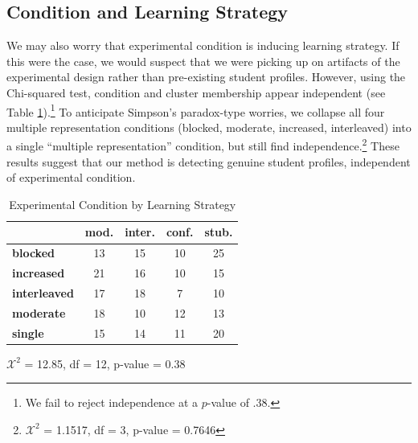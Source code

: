 \documentclass{edm_template}
\begin{document}
\subsection{Condition and Learning Strategy}

We may also worry that experimental condition is inducing learning strategy. If this were the case, we would suspect that we were picking up on artifacts of the experimental design rather than pre-existing student profiles. However, using the Chi-squared test, condition and cluster membership appear independent (see Table \ref{tab:exp-and-LS}).\footnote{We fail to reject independence at a $p$-value of $.38$.}  To anticipate Simpson's paradox-type worries, we collapse all four multiple representation conditions (blocked, moderate, increased, interleaved) into a single ``multiple representation'' condition, but still find independence.\footnote{$\mathcal{X}^{2}$ = 1.1517, df = 3, p-value = 0.7646} These results suggest that our method is detecting genuine student profiles, independent of experimental condition. 


\begin{table}[hbtp]
\centering

\begin{tabular}{|l || c | c | c | c |}
\hline
& mod. & inter. & conf. & stub. \\ \hline \hline
\textbf{blocked}&     13& 15& 10& 25\\ \hline
\textbf{increased}&   21& 16& 10& 15\\ \hline
\textbf{interleaved}& 17& 18&  7& 10\\ \hline
\textbf{moderate}&    18& 10& 12& 13\\ \hline
\textbf{single}&      15& 14& 11& 20\\ \hline
 \end{tabular}
 
 \begin{center} $\mathcal{X}^2$ = 12.85, df = 12, p-value = 0.38 \end{center}
\caption{Experimental Condition by Learning Strategy}
\label{tab:exp-and-LS}
\end{table}
\end{document}
